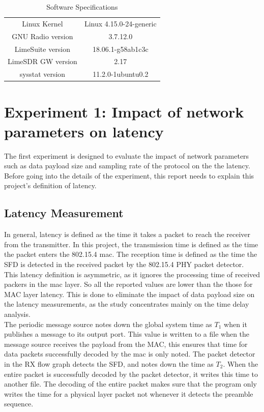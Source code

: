 \begin{table}[h!]
    \centering
    \begin{tabular}{|c|c|}
    \hline
         Linux Kernel &   Linux 4.15.0-24-generic \\
         GNU Radio version & 3.7.12.0 \\
         LimeSuite version &  18.06.1-g58ab1c3c \\
         LimeSDR GW version &   2.17\\
         sysstat version &  11.2.0-1ubuntu0.2\\
         \hline
    \end{tabular}
    \caption{Software Specifications}
    \label{software}
\end{table}

\section{Experiment 1: Impact of network parameters on latency}

The first experiment is designed to evaluate the impact of network parameters such as data payload size and sampling rate of the protocol on the the latency.
Before going into the details of the experiment, this report needs to explain this project's definition of latency.

\subsection{Latency Measurement}
In general, latency is defined as the time it takes a packet to reach the receiver from the transmitter.
In this project, the transmission time is defined as the time the packet enters the 802.15.4 \ac{mac}.
The reception time is defined as the time the \ac{SFD} is detected in the received packet by the 802.15.4 PHY packet detector.\\

This latency definition is asymmetric, as it ignores the processing time of received packers in the \ac{mac} layer. So all the reported values are lower than the those for MAC layer latency.
This is done to eliminate the impact of data payload size on the latency measurements, as the study concentrates mainly on the time delay analysis.\\

The periodic message source notes down the global system time as $T_1$ when it publishes a message to its output port.
This value is written to a file when the message source receives the payload from the MAC, this ensures that time for data packets successfully decoded by the \ac{mac} is only noted.
The packet detector in the RX flow graph detects the SFD, and notes down the time as $T_2$.
When the entire packet is successfully decoded by the packet detector, it writes this time to another file.
The decoding of the entire packet makes sure that the program only writes the time for a physical layer packet not whenever it detects the preamble sequence.\\

